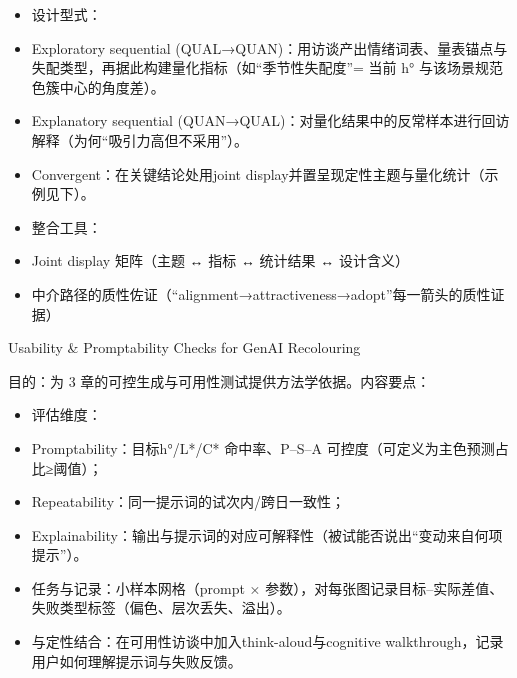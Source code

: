 \begin{itemize}

  \item 设计型式：

  \item Exploratory sequential (QUAL→QUAN)：用访谈产出情绪词表、量表锚点与失配类型，再据此构建量化指标（如“季节性失配度”= 当前 h° 与该场景规范色簇中心的角度差）。

  \item Explanatory sequential (QUAN→QUAL)：对量化结果中的反常样本进行回访解释（为何“吸引力高但不采用”）。

  \item Convergent：在关键结论处用joint display并置呈现定性主题与量化统计（示例见下）。

  \item 整合工具：

  \item Joint display 矩阵（主题 ↔ 指标 ↔ 统计结果 ↔ 设计含义）

  \item 中介路径的质性佐证（“alignment→attractiveness→adopt”每一箭头的质性证据）

\end{itemize}

Usability \& Promptability Checks for GenAI Recolouring

目的：为 3 章的可控生成与可用性测试提供方法学依据。内容要点：

\begin{itemize}

  \item 评估维度：

  \item Promptability：目标h°/L*/C* 命中率、P–S–A 可控度（可定义为主色预测占比≥阈值）；

  \item Repeatability：同一提示词的试次内/跨日一致性；

  \item Explainability：输出与提示词的对应可解释性（被试能否说出“变动来自何项提示”）。

  \item 任务与记录：小样本网格（prompt × 参数），对每张图记录目标–实际差值、失败类型标签（偏色、层次丢失、溢出）。

  \item 与定性结合：在可用性访谈中加入think-aloud与cognitive walkthrough，记录用户如何理解提示词与失败反馈。

\end{itemize}


